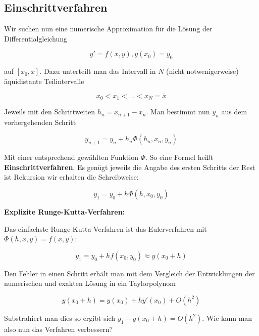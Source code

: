 \documentclass{report}
\begin{document}
\subsection{Einschrittverfahren} %
\label{sub:einschrittverfahren}

Wir suchen nun eine numerische Approximation für die Lösung der Differentialgleichung

\begin{equation}
    y' = f(x,y), y(x_0)= y_0
\end{equation}

auf $[x_0, \bar{x}]$. Dazu unterteilt man das Intervall in  $N$ (nicht notwenigerweise) äquidistante Teilintervalle

\begin{equation}
    x_0 < x_1 < ... < x_N = \bar{x}
\end{equation}

Jeweils mit den Schrittweiten $h_n = x_{n+1}-x_n$. Man bestimmt nun  $y_n$ aus dem vorhergehenden Schritt

\begin{equation}
    y_{n+1} = y_n + h_n \Phi(h_n,x_n,y_n)
\end{equation}

Mit einer entsprechend gewählten Funktion $\Phi$. So eine Formel heißt \textbf{Einschrittverfahren}. Es genügt jeweils die Angabe des ersten Schritts der Rest ist Rekursion wir erhalten die Schreibweise:

\begin{equation}
    y_1 = y_0 + h \Phi(h,x_0,y_0)
\end{equation}

\textbf{Explizite Runge-Kutta-Verfahren:}

Das einfachste Runge-Kutta-Verfahren ist das Eulerverfahren mit $\Phi(h,x,y) = f(x,y)$:

 \begin{equation}
    y_1 = y_0 + hf(x_0,y_0) \approx y(x_0 + h)
\end{equation}

Den Fehler in einen Schritt erhält man mit dem Vergleich der Entwicklungen der numerischen und exakten Lösung in ein Taylorpolynom

\begin{equation}
    y(x_0 + h) = y(x_0) + hy'(x_0) + O(h^2)
\end{equation}

Substrahiert man dies so ergibt sich $y_1 - y(x_0 + h)= O(h^2)$. Wie kann man also nun das Verfahren verbessern?
\end{document}
